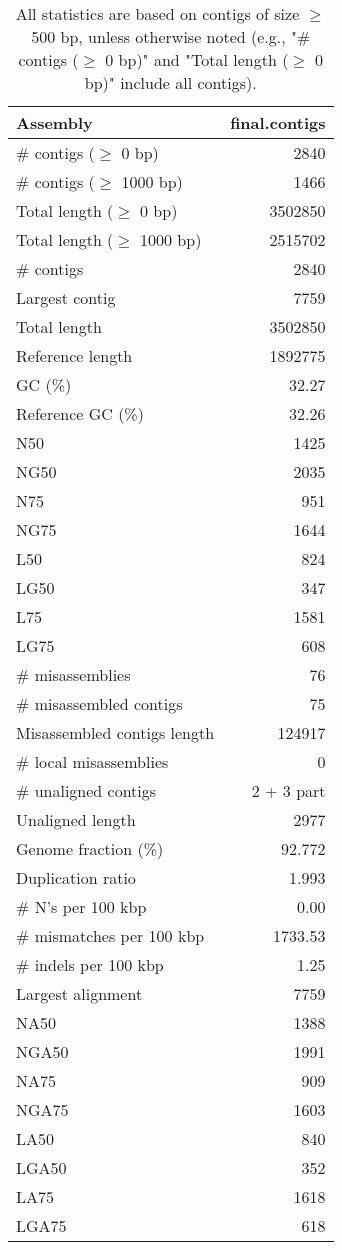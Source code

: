 \documentclass[12pt,a4paper]{article}
\begin{document}
\begin{table}[ht]
\begin{center}
\caption{All statistics are based on contigs of size $\geq$ 500 bp, unless otherwise noted (e.g., "\# contigs ($\geq$ 0 bp)" and "Total length ($\geq$ 0 bp)" include all contigs).}
\begin{tabular}{|l*{1}{|r}|}
\hline
Assembly & final.contigs \\ \hline
\# contigs ($\geq$ 0 bp) & 2840 \\ \hline
\# contigs ($\geq$ 1000 bp) & 1466 \\ \hline
Total length ($\geq$ 0 bp) & 3502850 \\ \hline
Total length ($\geq$ 1000 bp) & 2515702 \\ \hline
\# contigs & 2840 \\ \hline
Largest contig & 7759 \\ \hline
Total length & 3502850 \\ \hline
Reference length & 1892775 \\ \hline
GC (\%) & 32.27 \\ \hline
Reference GC (\%) & 32.26 \\ \hline
N50 & 1425 \\ \hline
NG50 & 2035 \\ \hline
N75 & 951 \\ \hline
NG75 & 1644 \\ \hline
L50 & 824 \\ \hline
LG50 & 347 \\ \hline
L75 & 1581 \\ \hline
LG75 & 608 \\ \hline
\# misassemblies & 76 \\ \hline
\# misassembled contigs & 75 \\ \hline
Misassembled contigs length & 124917 \\ \hline
\# local misassemblies & 0 \\ \hline
\# unaligned contigs & 2 + 3 part \\ \hline
Unaligned length & 2977 \\ \hline
Genome fraction (\%) & 92.772 \\ \hline
Duplication ratio & 1.993 \\ \hline
\# N's per 100 kbp & 0.00 \\ \hline
\# mismatches per 100 kbp & 1733.53 \\ \hline
\# indels per 100 kbp & 1.25 \\ \hline
Largest alignment & 7759 \\ \hline
NA50 & 1388 \\ \hline
NGA50 & 1991 \\ \hline
NA75 & 909 \\ \hline
NGA75 & 1603 \\ \hline
LA50 & 840 \\ \hline
LGA50 & 352 \\ \hline
LA75 & 1618 \\ \hline
LGA75 & 618 \\ \hline
\end{tabular}
\end{center}
\end{table}
\end{document}
